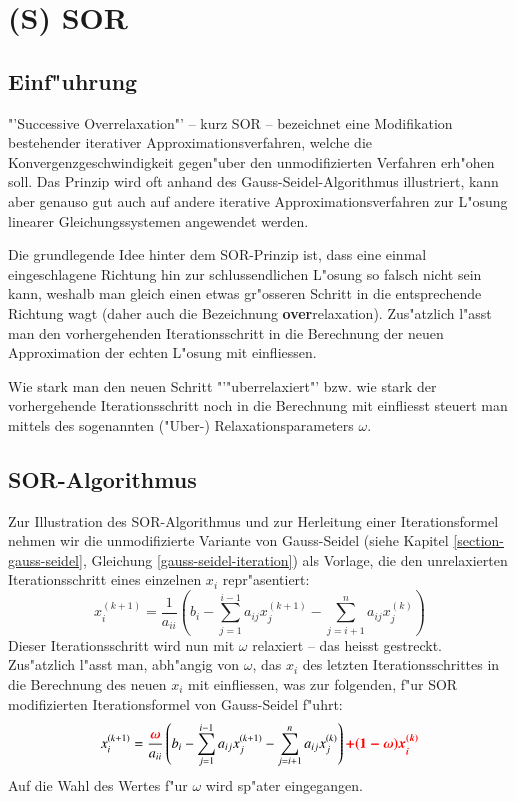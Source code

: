 \chapter{(S) SOR}
\begin{refsection}

\section{Einf"uhrung}
"'Successive Overrelaxation"' -- kurz SOR -- bezeichnet eine
Modifikation bestehender iterativer Approximationsverfahren, welche
die Konvergenzgeschwindigkeit gegen"uber den unmodifizierten Verfahren
erh"ohen soll. Das Prinzip wird oft anhand des Gauss-Seidel-Algorithmus
illustriert, kann aber genauso gut auch auf andere iterative
Approximationsverfahren zur L"osung linearer Gleichungssystemen angewendet
werden.

Die grundlegende Idee hinter dem SOR-Prinzip ist, dass eine einmal
eingeschlagene Richtung hin zur schlussendlichen L"osung so falsch
nicht sein kann, weshalb man gleich einen etwas gr"osseren Schritt
in die entsprechende Richtung wagt (daher auch die Bezeichnung
\textbf{over}relaxation). Zus"atzlich l"asst man den vorhergehenden
Iterationsschritt in die Berechnung der neuen Approximation der echten
L"osung mit einfliessen.

Wie stark man den neuen Schritt "'"uberrelaxiert"' bzw. wie stark der
vorhergehende Iterationsschritt noch in die Berechnung mit einfliesst
steuert man mittels des sogenannten ("Uber-) Relaxationsparameters
$\omega$.
	
\section{SOR-Algorithmus\label{sec: SOR-Alg.}}
Zur Illustration des SOR-Algorithmus und zur Herleitung einer
Iterationsformel nehmen wir die unmodifizierte Variante von
Gauss-Seidel (siehe Kapitel \ref{section-gauss-seidel}, Gleichung
\ref{gauss-seidel-iteration}) als Vorlage, die den unrelaxierten
Iterationsschritt eines einzelnen $x_i$ repr"asentiert:
\begin{equation} \label{eq: G.-S.-It.formel}
	x_i^{(k+1)} = \frac{1}{a_{ii}}\left(b_i-\sum\limits_{j=1}^{i-1} a_{ij}x_j^{(k+1)}-\sum\limits_{j=i+1}^na_{ij}x_j^{(k)}\right)
\end{equation}
Dieser Iterationsschritt wird nun mit $\omega$ relaxiert -- das heisst
gestreckt. Zus"atzlich l"asst man, abh"angig von $\omega$, das $x_i$
des letzten Iterationsschrittes in die Berechnung des neuen $x_i$ mit
einfliessen, was zur folgenden, f"ur SOR modifizierten Iterationsformel
von Gauss-Seidel f"uhrt:
\begin{equation} \label{eq: SOR-It.formel1}
	x_i^{(k+1)} = \frac{\boldsymbol{\textcolor{red}{\omega}}}{a_{ii}}\left(b_i-\sum\limits_{j=1}^{i-1}a_{ij}x_j^{(k+1)}-\sum\limits_{j=i+1}^n a_{ij}x_j^{(k)}\right)\boldsymbol{\textcolor{red}{+(1-\omega)x_i^{(k)}}}
\end{equation}
Auf die Wahl des Wertes f"ur $\omega$ wird sp"ater eingegangen.
		

\end{refsection}
